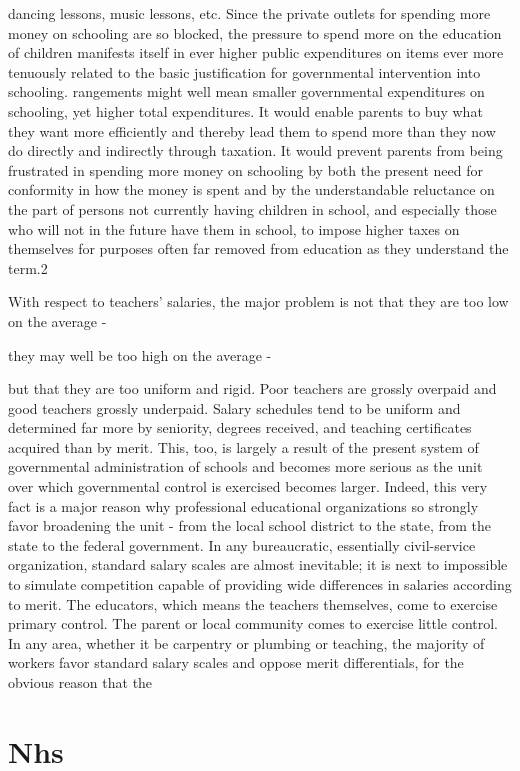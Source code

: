 \documentclass[11pt,openany]{book}
\newcommand{\booksection}[1]{%
  \phantomsection\section*{#1}%
  \addcontentsline{toc}{section}{#1}\markright{#1}}
\begin{document}
dancing lessons, music lessons, etc. Since the private outlets for spending more money on schooling are so blocked, the pressure to spend more on the education of children manifests itself in ever higher public expenditures on items ever more tenuously related to the basic justification for governmental intervention into schooling. rangements might well mean smaller governmental expenditures on schooling, yet higher total expenditures. It would enable parents to buy what they want more efficiently and thereby lead them to spend more than they now do directly and indirectly through taxation. It would prevent parents from being frustrated in spending more money on schooling by both the present need for conformity in how the money is spent and by the understandable reluctance on the part of persons not currently having children in school, and especially those who will not in the future have them in school, to impose higher taxes on themselves for purposes often far removed from education as they understand the term.2

With respect to teachers' salaries, the major problem is not that they are too low on the average -

they may well be too high on the average -

but that they are too uniform and rigid. Poor teachers are grossly overpaid and good teachers grossly underpaid. Salary schedules tend to be uniform and determined far more by seniority, degrees received, and teaching certificates acquired than by merit. This, too, is largely a result of the present system of governmental administration of schools and becomes more serious as the unit over which governmental control is exercised becomes larger. Indeed, this very fact is a major reason why professional educational organizations so strongly favor broadening the unit - from the local school district to the state, from the state to the federal government. In any bureaucratic, essentially civil-service organization, standard salary scales are almost inevitable; it is next to impossible to simulate competition capable of providing wide differences in salaries according to merit. The educators, which means the teachers themselves, come to exercise primary control. The parent or local community comes to exercise little control. In any area, whether it be carpentry or plumbing or teaching, the majority of workers favor standard salary scales and oppose merit differentials, for the obvious reason that the

\booksection{Nhs}
\end{document}

